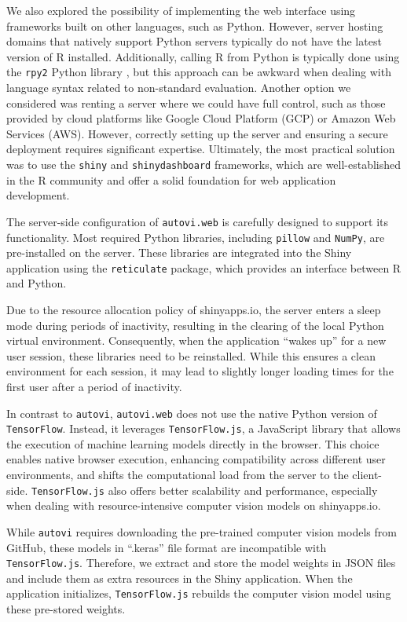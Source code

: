 \documentclass[
doublespace,
  times]{anzsauth}
\begin{document}
We also explored the possibility of implementing the web interface using
frameworks built on other languages, such as Python. However, server
hosting domains that natively support Python servers typically do not
have the latest version of R installed. Additionally, calling R from
Python is typically done using the \texttt{rpy2} Python library
\citep{rpy2}, but this approach can be awkward when dealing with
language syntax related to non-standard evaluation. Another option we
considered was renting a server where we could have full control, such
as those provided by cloud platforms like Google Cloud Platform (GCP) or
Amazon Web Services (AWS). However, correctly setting up the server and
ensuring a secure deployment requires significant expertise. Ultimately,
the most practical solution was to use the \texttt{shiny} and
\texttt{shinydashboard} frameworks, which are well-established in the R
community and offer a solid foundation for web application development.

The server-side configuration of \texttt{autovi.web} is carefully
designed to support its functionality. Most required Python libraries,
including \texttt{pillow} and \texttt{NumPy}, are pre-installed on the
server. These libraries are integrated into the Shiny application using
the \texttt{reticulate} package, which provides an interface between R
and Python.

Due to the resource allocation policy of shinyapps.io, the server enters
a sleep mode during periods of inactivity, resulting in the clearing of
the local Python virtual environment. Consequently, when the application
``wakes up'' for a new user session, these libraries need to be
reinstalled. While this ensures a clean environment for each session, it
may lead to slightly longer loading times for the first user after a
period of inactivity.

In contrast to \texttt{autovi}, \texttt{autovi.web} does not use the
native Python version of \texttt{TensorFlow}. Instead, it leverages
\texttt{TensorFlow.js}, a JavaScript library that allows the execution
of machine learning models directly in the browser. This choice enables
native browser execution, enhancing compatibility across different user
environments, and shifts the computational load from the server to the
client-side. \texttt{TensorFlow.js} also offers better scalability and
performance, especially when dealing with resource-intensive computer
vision models on shinyapps.io.

While \texttt{autovi} requires downloading the pre-trained computer
vision models from GitHub, these models in ``.keras'' file format are
incompatible with \texttt{TensorFlow.js}. Therefore, we extract and
store the model weights in JSON files and include them as extra
resources in the Shiny application. When the application initializes,
\texttt{TensorFlow.js} rebuilds the computer vision model using these
pre-stored weights.
\end{document}
